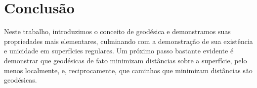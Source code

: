 \section{Conclusão}

Neste trabalho, introduzimos o conceito de geodésica e demonstramos suas propriedades mais elementares, culminando com a demonstração de sua existência e unicidade em superfícies regulares.
Um próximo passo bastante evidente é demonstrar que geodésicas de fato minimizam distâncias sobre a superfície, pelo menos localmente, e, reciprocamente, que caminhos que minimizam distâncias são geodésicas.
